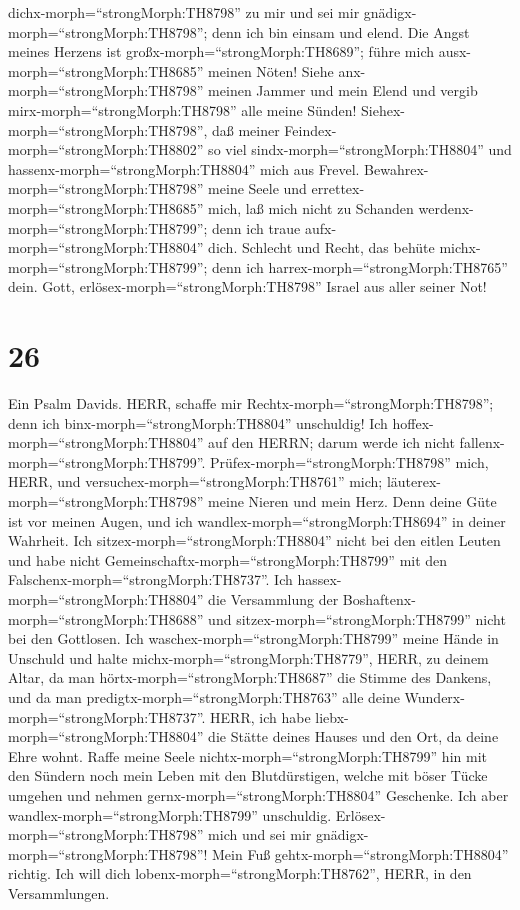dichx-morph=``strongMorph:TH8798'' zu mir und sei mir
gnädigx-morph=``strongMorph:TH8798''; denn ich bin einsam und elend.
 Die Angst meines Herzens ist
großx-morph=``strongMorph:TH8689''; führe mich
ausx-morph=``strongMorph:TH8685'' meinen Nöten!  Siehe
anx-morph=``strongMorph:TH8798'' meinen Jammer und mein Elend und vergib
mirx-morph=``strongMorph:TH8798'' alle meine Sünden! 
Siehex-morph=``strongMorph:TH8798'', daß meiner
Feindex-morph=``strongMorph:TH8802'' so viel
sindx-morph=``strongMorph:TH8804'' und
hassenx-morph=``strongMorph:TH8804'' mich aus Frevel. 
Bewahrex-morph=``strongMorph:TH8798'' meine Seele und
errettex-morph=``strongMorph:TH8685'' mich, laß mich nicht zu Schanden
werdenx-morph=``strongMorph:TH8799''; denn ich traue
aufx-morph=``strongMorph:TH8804'' dich.  Schlecht und
Recht, das behüte michx-morph=``strongMorph:TH8799''; denn ich
harrex-morph=``strongMorph:TH8765'' dein.  Gott,
erlösex-morph=``strongMorph:TH8798'' Israel aus aller seiner Not!

\hypertarget{section-25}{%
\section{26}\label{section-25}}

 Ein Psalm Davids. HERR, schaffe mir
Rechtx-morph=``strongMorph:TH8798''; denn ich
binx-morph=``strongMorph:TH8804'' unschuldig! Ich
hoffex-morph=``strongMorph:TH8804'' auf den HERRN; darum werde ich nicht
fallenx-morph=``strongMorph:TH8799''. 
Prüfex-morph=``strongMorph:TH8798'' mich, HERR, und
versuchex-morph=``strongMorph:TH8761'' mich;
läuterex-morph=``strongMorph:TH8798'' meine Nieren und mein Herz.
 Denn deine Güte ist vor meinen Augen, und ich
wandlex-morph=``strongMorph:TH8694'' in deiner Wahrheit. 
Ich sitzex-morph=``strongMorph:TH8804'' nicht bei den eitlen Leuten und
habe nicht Gemeinschaftx-morph=``strongMorph:TH8799'' mit den
Falschenx-morph=``strongMorph:TH8737''.  Ich
hassex-morph=``strongMorph:TH8804'' die Versammlung der
Boshaftenx-morph=``strongMorph:TH8688'' und
sitzex-morph=``strongMorph:TH8799'' nicht bei den Gottlosen.
 Ich waschex-morph=``strongMorph:TH8799'' meine Hände in
Unschuld und halte michx-morph=``strongMorph:TH8779'', HERR, zu deinem
Altar,  da man hörtx-morph=``strongMorph:TH8687'' die Stimme
des Dankens, und da man predigtx-morph=``strongMorph:TH8763'' alle deine
Wunderx-morph=``strongMorph:TH8737''.  HERR, ich habe
liebx-morph=``strongMorph:TH8804'' die Stätte deines Hauses und den Ort,
da deine Ehre wohnt.  Raffe meine Seele
nichtx-morph=``strongMorph:TH8799'' hin mit den Sündern noch mein Leben
mit den Blutdürstigen,  welche mit böser Tücke umgehen und
nehmen gernx-morph=``strongMorph:TH8804'' Geschenke.  Ich
aber wandlex-morph=``strongMorph:TH8799'' unschuldig.
Erlösex-morph=``strongMorph:TH8798'' mich und sei mir
gnädigx-morph=``strongMorph:TH8798''!  Mein Fuß
gehtx-morph=``strongMorph:TH8804'' richtig. Ich will dich
lobenx-morph=``strongMorph:TH8762'', HERR, in den Versammlungen.

